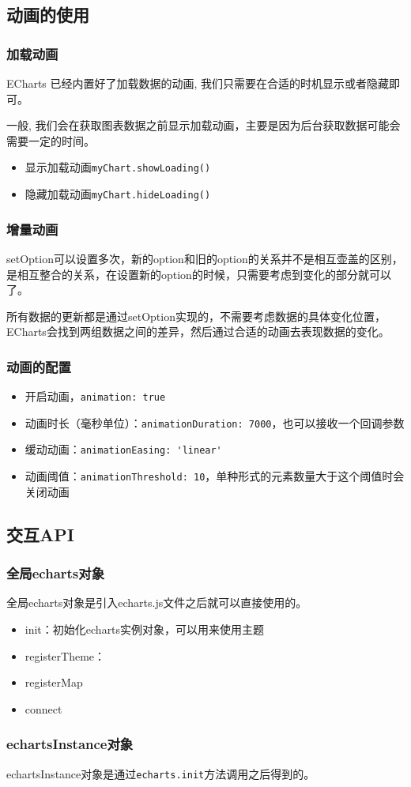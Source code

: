 \subsection{动画的使用}

\subsubsection{加载动画}
ECharts 已经内置好了加载数据的动画, 我们只需要在合适的时机显示或者隐藏即可。

一般, 我们会在获取图表数据之前显示加载动画，主要是因为后台获取数据可能会需要一定的时间。
\begin{itemize}
    \item 显示加载动画\verb|myChart.showLoading()|
    \item 隐藏加载动画\verb|myChart.hideLoading()|
\end{itemize}

\subsubsection{增量动画} setOption可以设置多次，新的option和旧的option的关系并不是相互壶盖的区别，是相互整合的关系，在设置新的option的时候，只需要考虑到变化的部分就可以了。

所有数据的更新都是通过setOption实现的，不需要考虑数据的具体变化位置，ECharts会找到两组数据之间的差异，然后通过合适的动画去表现数据的变化。
\subsubsection{动画的配置} 
\begin{itemize}
    \item 开启动画，\verb|animation: true|
    \item 动画时长（毫秒单位）：\verb|animationDuration: 7000|，也可以接收一个回调参数
    \item 缓动动画：\verb|animationEasing: 'linear'|
    \item 动画阈值：\verb|animationThreshold: 10|，单种形式的元素数量大于这个阈值时会关闭动画
\end{itemize}
\subsection{交互API}
\subsubsection{全局echarts对象}
全局echarts对象是引入echarts.js文件之后就可以直接使用的。

\begin{itemize}
    \item init：初始化echarts实例对象，可以用来使用主题
    \item registerTheme：
    \item registerMap
    \item connect
\end{itemize}
\subsubsection{echartsInstance对象}
echartsInstance对象是通过\verb|echarts.init|方法调用之后得到的。
